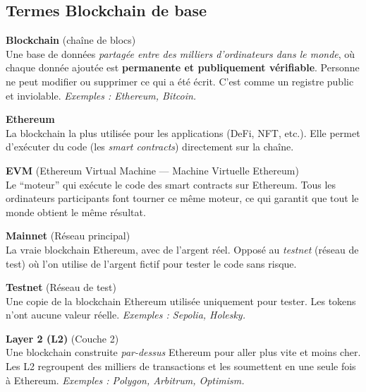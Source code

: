 \documentclass[12pt, a4paper]{article}
\begin{document}
\subsection{Termes Blockchain de base}

\begin{tcolorbox}[colback=gray!4, colframe=gray!50, breakable]

\textbf{Blockchain} (chaîne de blocs)\\
\hspace*{1em} Une base de données \textit{partagée entre des milliers d'ordinateurs dans le monde},
où chaque donnée ajoutée est \textbf{permanente et publiquement vérifiable}. Personne ne peut
modifier ou supprimer ce qui a été écrit. C'est comme un registre public et inviolable.
\textit{Exemples : Ethereum, Bitcoin.}

\vspace{0.4cm}

\textbf{Ethereum}\\
\hspace*{1em} La blockchain la plus utilisée pour les applications (DeFi, NFT, etc.). Elle permet
d'exécuter du code (les \textit{smart contracts}) directement sur la chaîne.

\vspace{0.4cm}

\textbf{EVM} (Ethereum Virtual Machine --- Machine Virtuelle Ethereum)\\
\hspace*{1em} Le ``moteur'' qui exécute le code des smart contracts sur Ethereum. Tous les
ordinateurs participants font tourner ce même moteur, ce qui garantit que tout le monde obtient
le même résultat.

\vspace{0.4cm}

\textbf{Mainnet} (Réseau principal)\\
\hspace*{1em} La vraie blockchain Ethereum, avec de l'argent réel. Opposé au \textit{testnet}
(réseau de test) où l'on utilise de l'argent fictif pour tester le code sans risque.

\vspace{0.4cm}

\textbf{Testnet} (Réseau de test)\\
\hspace*{1em} Une copie de la blockchain Ethereum utilisée uniquement pour tester. Les tokens
n'ont aucune valeur réelle. \textit{Exemples : Sepolia, Holesky.}

\vspace{0.4cm}

\textbf{Layer 2 (L2)} (Couche 2)\\
\hspace*{1em} Une blockchain construite \textit{par-dessus} Ethereum pour aller plus vite et moins
cher. Les L2 regroupent des milliers de transactions et les soumettent en une seule fois à
Ethereum. \textit{Exemples : Polygon, Arbitrum, Optimism.}

\end{tcolorbox}
\end{document}
